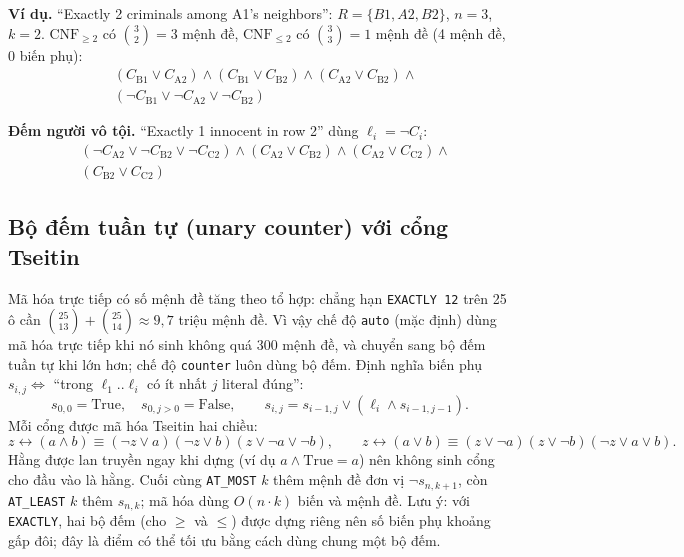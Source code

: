 \documentclass{article}
\newcommand{\code}[1]{\texttt{#1}}
\begin{document}
\textbf{Ví dụ.} ``Exactly 2 criminals among A1's neighbors'': $R = \{B1, A2, B2\}$, $n=3$, $k=2$. $\text{CNF}_{\ge 2}$ có $\binom{3}{2}=3$ mệnh đề, $\text{CNF}_{\le 2}$ có $\binom{3}{3}=1$ mệnh đề (4 mệnh đề, 0 biến phụ):
\begin{align*}
& (C_{\mathrm{B1}} \lor C_{\mathrm{A2}}) \land (C_{\mathrm{B1}} \lor C_{\mathrm{B2}}) \land (C_{\mathrm{A2}} \lor C_{\mathrm{B2}}) \land \\
& (\neg C_{\mathrm{B1}} \lor \neg C_{\mathrm{A2}} \lor \neg C_{\mathrm{B2}})
\end{align*}

\textbf{Đếm người vô tội.} ``Exactly 1 innocent in row 2'' dùng $\ell_i = \neg C_i$:
\begin{align*}
& (\neg C_{\mathrm{A2}} \lor \neg C_{\mathrm{B2}} \lor \neg C_{\mathrm{C2}}) \land (C_{\mathrm{A2}} \lor C_{\mathrm{B2}}) \land (C_{\mathrm{A2}} \lor C_{\mathrm{C2}}) \land \\
& (C_{\mathrm{B2}} \lor C_{\mathrm{C2}})
\end{align*}

\subsection{Bộ đếm tuần tự (unary counter) với cổng Tseitin}
Mã hóa trực tiếp có số mệnh đề tăng theo tổ hợp: chẳng hạn \code{EXACTLY 12} trên 25 ô cần $\binom{25}{13}+\binom{25}{14} \approx 9{,}7$ triệu mệnh đề. Vì vậy chế độ \code{auto} (mặc định) dùng mã hóa trực tiếp khi nó sinh không quá 300 mệnh đề, và chuyển sang bộ đếm tuần tự khi lớn hơn; chế độ \code{counter} luôn dùng bộ đếm. Định nghĩa biến phụ $s_{i,j} \iff$ ``trong $\ell_1..\ell_i$ có ít nhất $j$ literal đúng'':
\begin{equation} s_{0,0} = \text{True},\quad s_{0,j>0} = \text{False},\qquad s_{i,j} = s_{i-1,j} \lor (\ell_i \land s_{i-1,j-1}). \end{equation}
Mỗi cổng được mã hóa Tseitin hai chiều:
\[ z \leftrightarrow (a \land b) \equiv (\neg z \lor a)(\neg z \lor b)(z \lor \neg a \lor \neg b), \qquad z \leftrightarrow (a \lor b) \equiv (z \lor \neg a)(z \lor \neg b)(\neg z \lor a \lor b). \]
Hằng được lan truyền ngay khi dựng (ví dụ $a \land \text{True} = a$) nên không sinh cổng cho đầu vào là hằng. Cuối cùng \code{AT\_MOST} $k$ thêm mệnh đề đơn vị $\neg s_{n,k+1}$, còn \code{AT\_LEAST} $k$ thêm $s_{n,k}$; mã hóa dùng $O(n\cdot k)$ biến và mệnh đề. Lưu ý: với \code{EXACTLY}, hai bộ đếm (cho $\ge$ và $\le$) được dựng riêng nên số biến phụ khoảng gấp đôi; đây là điểm có thể tối ưu bằng cách dùng chung một bộ đếm.
\end{document}
